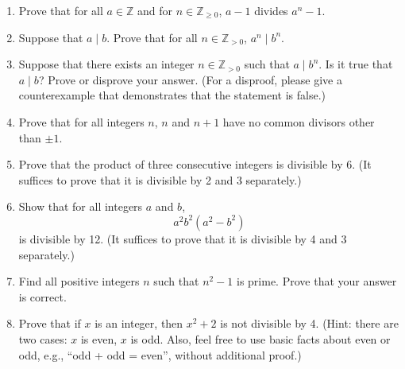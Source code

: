 \begin{enumerate}
\item Prove that for all $a \in \mathbb{Z}$ and for $n \in \mathbb{Z}_{\geq 0}$, $a-1$ divides $a^n -1$.

\item Suppose that $a \mid b$. Prove that for all $n \in \mathbb{Z}_{> 0}$, $a^n \mid b^n$.
  
\item Suppose that there exists an integer $n \in \mathbb{Z}_{> 0}$ such that $a \mid b^n$. Is it true that $a \mid b$? Prove or disprove your answer. (For a disproof, please give a counterexample that demonstrates that the statement is false.)
  


\item Prove that for all integers $n$, $n$ and $n+1$ have no common divisors other than $\pm 1$.


\item Prove that the product of three consecutive integers is divisible by 6. (It suffices to prove that it is divisible by 2 and 3 separately.)

\item Show that for all integers $a$ and $b$, 
\[
a^2b^2(a^2 - b^2)
\]
is divisible by 12. (It suffices to prove that it is divisible by 4 and 3 separately.)

\item Find all positive integers $n$ such that $n^2 - 1$ is prime. Prove that your answer is correct.

\item Prove that if $x$ is an integer, then $x^2 + 2$ is not divisible by 4. (Hint: there are two cases: $x$ is even, $x$ is odd. Also, feel free to use basic facts about even or odd, e.g., ``odd + odd = even'', without additional proof.)
  
\end{enumerate}



